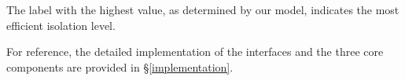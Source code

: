 {The label with the highest value, as determined by our model, indicates the most efficient isolation level.

For reference, the detailed implementation of the interfaces and the three core components are provided in \S\ref{implementation}.



}
